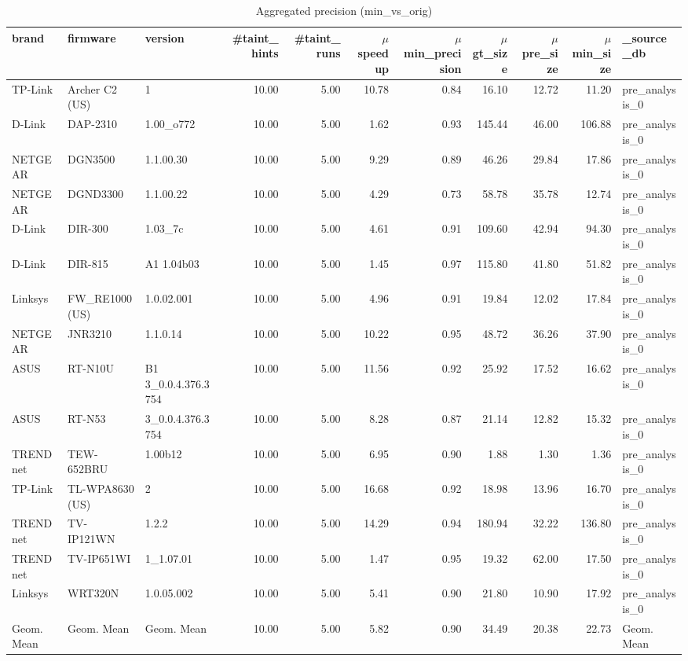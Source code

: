 \begin{table}[ht!]
\centering
\footnotesize
\begin{tabular}{| l | l | l | r | r | r | r | r | r | r | l |}
\hline
\textbf{brand} & \textbf{firmware} & \textbf{version} & \textbf{\#taint\_hints} & \textbf{\#taint\_runs} & \textbf{$\mu$speedup} & \textbf{$\mu$min\_precision} & \textbf{$\mu$gt\_size} & \textbf{$\mu$pre\_size} & \textbf{$\mu$min\_size} & \textbf{\_source\_db} \\
\hline
TP-Link & Archer C2 (US) & 1 & 10.00 & 5.00 & 10.78 & 0.84 & 16.10 & 12.72 & 11.20 & pre\_analysis\_0 \\
D-Link & DAP-2310 & 1.00\_o772 & 10.00 & 5.00 & 1.62 & 0.93 & 145.44 & 46.00 & 106.88 & pre\_analysis\_0 \\
NETGEAR & DGN3500 & 1.1.00.30 & 10.00 & 5.00 & 9.29 & 0.89 & 46.26 & 29.84 & 17.86 & pre\_analysis\_0 \\
NETGEAR & DGND3300 & 1.1.00.22 & 10.00 & 5.00 & 4.29 & 0.73 & 58.78 & 35.78 & 12.74 & pre\_analysis\_0 \\
D-Link & DIR-300 & 1.03\_7c & 10.00 & 5.00 & 4.61 & 0.91 & 109.60 & 42.94 & 94.30 & pre\_analysis\_0 \\
D-Link & DIR-815 & A1 1.04b03 & 10.00 & 5.00 & 1.45 & 0.97 & 115.80 & 41.80 & 51.82 & pre\_analysis\_0 \\
Linksys & FW\_RE1000 (US) & 1.0.02.001 & 10.00 & 5.00 & 4.96 & 0.91 & 19.84 & 12.02 & 17.84 & pre\_analysis\_0 \\
NETGEAR & JNR3210 & 1.1.0.14 & 10.00 & 5.00 & 10.22 & 0.95 & 48.72 & 36.26 & 37.90 & pre\_analysis\_0 \\
ASUS & RT-N10U & B1 3\_0.0.4.376.3754 & 10.00 & 5.00 & 11.56 & 0.92 & 25.92 & 17.52 & 16.62 & pre\_analysis\_0 \\
ASUS & RT-N53 & 3\_0.0.4.376.3754 & 10.00 & 5.00 & 8.28 & 0.87 & 21.14 & 12.82 & 15.32 & pre\_analysis\_0 \\
TRENDnet & TEW-652BRU & 1.00b12 & 10.00 & 5.00 & 6.95 & 0.90 & 1.88 & 1.30 & 1.36 & pre\_analysis\_0 \\
TP-Link & TL-WPA8630 (US) & 2 & 10.00 & 5.00 & 16.68 & 0.92 & 18.98 & 13.96 & 16.70 & pre\_analysis\_0 \\
TRENDnet & TV-IP121WN & 1.2.2 & 10.00 & 5.00 & 14.29 & 0.94 & 180.94 & 32.22 & 136.80 & pre\_analysis\_0 \\
TRENDnet & TV-IP651WI & 1\_1.07.01 & 10.00 & 5.00 & 1.47 & 0.95 & 19.32 & 62.00 & 17.50 & pre\_analysis\_0 \\
Linksys & WRT320N & 1.0.05.002 & 10.00 & 5.00 & 5.41 & 0.90 & 21.80 & 10.90 & 17.92 & pre\_analysis\_0 \\
\hline
Geom. Mean & Geom. Mean & Geom. Mean & 10.00 & 5.00 & 5.82 & 0.90 & 34.49 & 20.38 & 22.73 & Geom. Mean \\
\hline
\end{tabular}
\caption{Aggregated precision (min\_vs\_orig)}
\label{tab:agg_results}
\end{table}